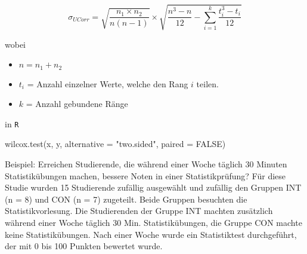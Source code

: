 \documentclass[
]{book}
\newenvironment{Shaded}{\begin{snugshade}}{\end{snugshade}}
\newcommand{\AttributeTok}[1]{\textcolor[rgb]{0.77,0.63,0.00}{#1}}
\newcommand{\ConstantTok}[1]{\textcolor[rgb]{0.00,0.00,0.00}{#1}}
\newcommand{\FunctionTok}[1]{\textcolor[rgb]{0.00,0.00,0.00}{#1}}
\newcommand{\NormalTok}[1]{#1}
\newcommand{\StringTok}[1]{\textcolor[rgb]{0.31,0.60,0.02}{#1}}
\providecommand{\tightlist}{%
  \setlength{\itemsep}{0pt}\setlength{\parskip}{0pt}}
\begin{document}
\begin{equation}
  \sigma_{UCorr} = \sqrt{\frac{n_1 \times n_2}{n(n-1)}} \times \sqrt{\frac{n^3-n}{12}-\sum_{i=1}^k\frac{t_i^3-t_i}{12}}
  \label{eq:s-U-corr}
\end{equation}

wobei

\begin{itemize}
\tightlist
\item
  \(n = n_1 + n_2\)\\
\item
  \(t_i\) = Anzahl einzelner Werte, welche den Rang \(i\) teilen.\\
\item
  \(k\) = Anzahl gebundene Ränge
\end{itemize}

in \texttt{R}

\begin{Shaded}
\begin{Highlighting}[]
\FunctionTok{wilcox.test}\NormalTok{(x, y, }\AttributeTok{alternative =} \StringTok{"two.sided"}\NormalTok{, }\AttributeTok{paired =} \ConstantTok{FALSE}\NormalTok{)}
\end{Highlighting}
\end{Shaded}

Beispiel: Erreichen Studierende, die während einer Woche täglich 30 Minuten Statistikübungen machen, bessere Noten in einer Statistikprüfung? Für diese Studie wurden 15 Studierende zufällig ausgewählt und zufällig den Gruppen INT (n = 8) und CON (n = 7) zugeteilt. Beide Gruppen besuchten die Statistikvorlesung. Die Studierenden der Gruppe INT machten zusätzlich während einer Woche täglich 30 Min. Statistikübungen, die Gruppe CON machte keine Statistikübungen. Nach einer Woche wurde ein Statistiktest durchgeführt, der mit 0 bis 100 Punkten bewertet wurde.
\end{document}
